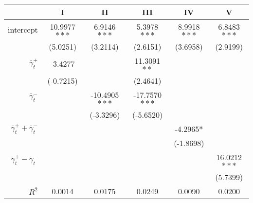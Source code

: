 \begin{tabular}{rSSSSS}
\toprule
{} &             I &             II &            III &           IV &             V \\
\midrule
intercept &  10.9977$***$ &    6.9146$***$ &    5.3978$***$ &  8.9918$***$ &   6.8483$***$ \\
          &      (5.0251) &       (3.2114) &       (2.6151) &     (3.6958) &      (2.9199) \\
$\overline \gamma^+_t$       &       -3.4277 &                &    11.3091$**$ &              &               \\
          &     (-0.7215) &                &       (2.4641) &              &               \\
$\overline \gamma^-_t$       &               &  -10.4905$***$ &  -17.7570$***$ &              &               \\
          &               &      (-3.3296) &      (-5.6520) &              &               \\
$\overline \gamma^+_t + \overline \gamma^-_t$   &               &                &                &   -4.2965$*$ &               \\
          &               &                &                &    (-1.8698) &               \\
$\overline \gamma^+_t - \overline \gamma^-_t$  &               &                &                &              &  16.0212$***$ \\
          &               &                &                &              &      (5.7399) \\
\midrule
$R^2$ & 0.0014 & 0.0175 & 0.0249 & 0.0090 & 0.0200\\\bottomrule
\end{tabular}
